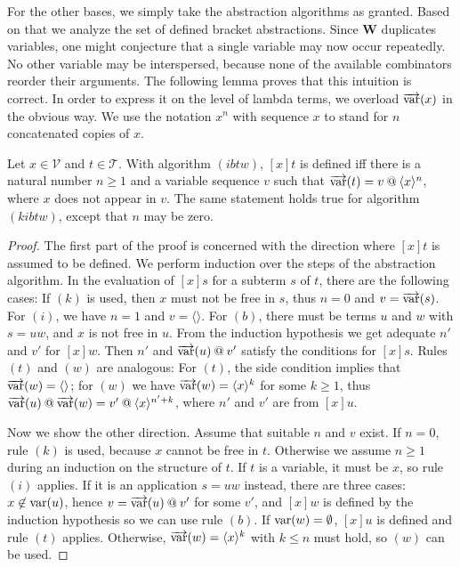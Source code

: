 For the other bases, we simply take the abstraction algorithms as granted.
Based on that we analyze the set of defined bracket abstractions.
Since $\mathbf{W}$ duplicates variables, one might conjecture that a single
variable may now occur repeatedly.
No other variable may be interspersed, because none of the available combinators
reorder their arguments.
The following lemma proves that this intuition is correct.
In order to express it on the level of lambda terms, we overload $\overrightarrow{\operatorname{var}}(x)$
in the obvious way.
We use the notation $x^n$ with sequence $x$ to stand for $n$ concatenated
copies of $x$.

\begin{lemma}
Let $x \in \mathcal{V}$ and $t \in \mathcal{T}$.
With algorithm $(ibtw)$, $[x]t$ is defined iff there is a natural number
$n \geq 1$ and a variable sequence $v$ such that
$\overrightarrow{\operatorname{var}}(t) = v \mathbin{@} \langle x \rangle^n$, where $x$ does not appear in $v$.
The same statement holds true for algorithm $(kibtw)$, except that $n$ may be
zero.
\end{lemma}
\begin{proof}
The first part of the proof is concerned with the direction where $[x]t$ is
assumed to be defined.
We perform induction over the steps of the abstraction algorithm.
In the evaluation of $[x]s$ for a subterm $s$ of $t$, there are the following
cases:
If $(k)$ is used, then $x$ must not be free in $s$, thus $n = 0$ and $v = \overrightarrow{\operatorname{var}}(s)$.
For $(i)$, we have $n = 1$ and $v = \langle\rangle$.
For $(b)$, there must be terms $u$ and $w$ with $s = uw$, and $x$ is not free
in $u$.
From the induction hypothesis we get adequate $n'$ and $v'$ for $[x]w$.
Then $n'$ and $\overrightarrow{\operatorname{var}}(u) \mathbin{@} v'$ satisfy the conditions for $[x]s$.
Rules $(t)$ and $(w)$ are analogous:
For $(t)$, the side condition implies that $\overrightarrow{\operatorname{var}}(w) = \langle\rangle$;
for $(w)$ we have $\overrightarrow{\operatorname{var}}(w) = \langle x \rangle^k$ for some $k \geq 1$,
thus $\overrightarrow{\operatorname{var}}(u) \mathbin{@} \overrightarrow{\operatorname{var}}(w) = v' \mathbin{@} \langle x \rangle^{n'+k}$,
where $n'$ and $v'$ are from $[x]u$.

Now we show the other direction.
Assume that suitable $n$ and $v$ exist.
If $n = 0$, rule $(k)$ is used, because $x$ cannot be free in $t$.
Otherwise we assume $n \geq 1$ during an induction on the structure of $t$.
If $t$ is a variable, it must be $x$, so rule $(i)$ applies.
If it is an application $s = uw$ instead, there are three cases:
$x \not\in \operatorname{var}(u)$, hence $v = \overrightarrow{\operatorname{var}}(u) \mathbin{@} v'$ for some $v'$,
and $[x]w$ is defined by the induction hypothesis so we can use rule $(b)$.
If $\operatorname{var}(w) = \emptyset$, $[x]u$ is defined and rule $(t)$ applies.
Otherwise, $\overrightarrow{\operatorname{var}}(w) = \langle x \rangle^k$ with $k \leq n$ must hold,
so $(w)$ can be used.
\end{proof}

